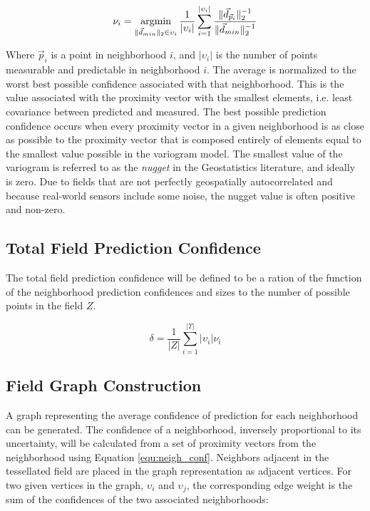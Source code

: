 \documentclass[11pt]{ucthesis}
\begin{document}
\begin{equation}
\label{equ:neigh_conf}
\nu_i = \operatornamewithlimits{argmin}_{\| \vec{d}_{min} \|_2 \in \upsilon_i} \frac{1}{|\upsilon_i|} \large\sum_{i = 1}^{|\upsilon_i|} \frac{\| \vec{d}_{\vec{p}_i} \|_{2}^{-1}} {\| \vec{d}_{min} \|_2^{-1}}
\end{equation}

Where $\vec{p}_i$ is a point in neighborhood $i$, and $|\upsilon_i|$ is the number of points measurable and predictable in neighborhood $i$. The average is normalized to the worst best possible confidence associated with that neighborhood. This is the value associated with the proximity vector with the smallest elements, i.e. least covariance between predicted and measured. %
The best possible prediction confidence occurs when every proximity vector in a given neighborhood is as close as possible to the proximity vector that is composed entirely of elements equal to the smallest value possible in the variogram model. The smallest value of the variogram is referred to as the \textit{nugget} in the Geostatistics literature, and ideally is zero. Due to fields that are not perfectly geospatially autocorrelated and because real-world sensors include some noise, the nugget value is often positive and non-zero. 

\subsection{Total Field Prediction Confidence}
The total field prediction confidence will be defined to be a ration of the function of the neighborhood prediction confidences and sizes to the number of possible points in the field $Z$.

\begin{equation}
\delta = \frac{1}{|Z|} \sum_{i = 1}^{|\Upsilon|} |\upsilon_i| \nu_i
\end{equation}

\subsection{Field Graph Construction}
A graph representing the average confidence of prediction for each neighborhood can be generated. The confidence of a neighborhood, inversely proportional to its uncertainty, will be calculated from a set of proximity vectors from the neighborhood using Equation \ref{equ:neigh_conf}. Neighbors adjacent in the tessellated field are placed in the graph representation as adjacent vertices. For two given vertices in the graph, $\upsilon_i$ and $\upsilon_j$, the corresponding edge weight is the sum of the confidences of the two associated neighborhoods:
\end{document}
